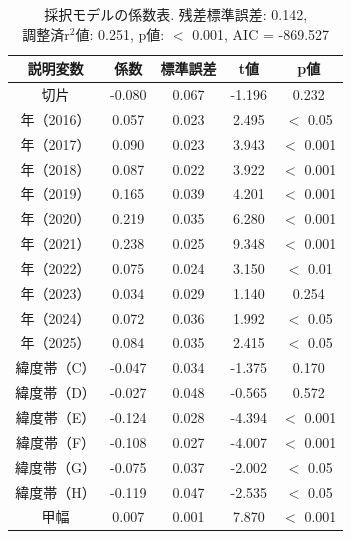 
 \begin{table}[htbp]
	\caption{採択モデルの係数表. 残差標準誤差: 0.142, \\ 
	調整済r$^{2}$値: 0.251, p値: $<$ 0.001, AIC = -869.527}
	 \label{TBL3:CFB}
	 \begin{center}
	  {\setlength{\tabcolsep}{4pt}\footnotesize
	  \begin{tabular}{ccccc} \hline
説明変数     & 係数   & 標準誤差 & t値    & p値        \\ \hline
切片        & -0.080 & 0.067 & -1.196 & 0.232       \\
年（2016）  & 0.057  & 0.023 & 2.495  &  $<$ 0.05  \\
年（2017）  & 0.090  & 0.023 & 3.943  & $<$ 0.001  \\
年（2018）  & 0.087  & 0.022 & 3.922  & $<$ 0.001  \\
年（2019）  & 0.165  & 0.039 & 4.201  & $<$ 0.001  \\
年（2020）  & 0.219  & 0.035 & 6.280  & $<$ 0.001  \\
年（2021）  & 0.238  & 0.025 & 9.348  & $<$ 0.001  \\
年（2022）  & 0.075  & 0.024 & 3.150  & $<$ 0.01   \\
年（2023）  & 0.034  & 0.029 & 1.140  & 0.254       \\
年（2024）  & 0.072  & 0.036 & 1.992  & $<$ 0.05   \\
年（2025）  & 0.084  & 0.035 & 2.415  & $<$ 0.05   \\
緯度帯（C）  & -0.047 & 0.034 & -1.375 & 0.170       \\
緯度帯（D）  & -0.027 & 0.048 & -0.565 & 0.572       \\
緯度帯（E）  & -0.124 & 0.028 & -4.394 & $<$ 0.001  \\
緯度帯（F）  & -0.108 & 0.027 & -4.007 & $<$ 0.001  \\
緯度帯（G）  & -0.075 & 0.037 & -2.002 & $<$ 0.05   \\
緯度帯（H）  & -0.119 & 0.047 & -2.535 & $<$ 0.05   \\
甲幅        & 0.007  & 0.001 & 7.870  & $<$ 0.001  \\ \hline
	  \end{tabular}}
	 \end{center}


\end{table}%

